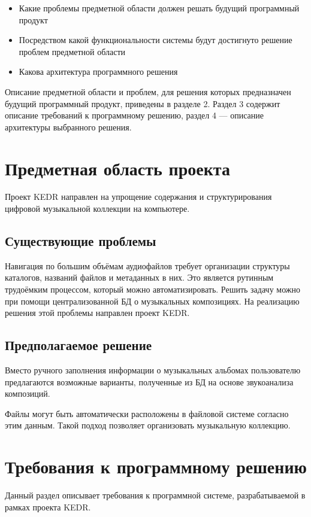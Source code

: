 \documentclass[pdftex,12pt,a4paper]{report}
\begin{document}
\begin{itemize}
	\item Какие проблемы предметной области должен решать будущий программный продукт
	\item Посредством какой функциональности системы будут достигнуто решение проблем предметной области
	\item Какова архитектура программного решения
\end{itemize}

Описание предметной области и проблем, для решения которых предназначен будущий программный продукт, приведены в разделе 2.
Раздел 3 содержит описание требований к программному решению, раздел 4 --- описание архитектуры выбранного решения.

\section{Предметная область проекта}
Проект KEDR направлен на упрощение содержания и структурирования цифровой музыкальной коллекции на компьютере.

\subsection{Существующие проблемы}
Навигация по большим объёмам аудиофайлов требует организации структуры каталогов, названий файлов и метаданных в них.
Это является рутинным трудоёмким процессом, который можно автоматизировать.
Решить задачу можно при помощи централизованной БД о музыкальных композициях.
На реализацию решения этой проблемы направлен проект KEDR.

\subsection{Предполагаемое решение}
Вместо ручного заполнения информации о музыкальных альбомах пользователю предлагаются возможные варианты, полученные из БД на основе звукоанализа композиций.

Файлы могут быть автоматически расположены в файловой системе согласно этим данным.
Такой подход позволяет организовать музыкальную коллекцию.

\section{Требования к программному решению}
Данный раздел описывает требования к программной системе, разрабатываемой в рамках проекта KEDR.
\end{document}
